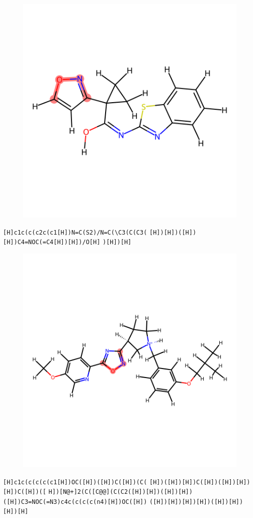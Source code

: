 \documentclass{article}
\begin{document}
\begin{figure}[ht]
\centering
    \includegraphics{mol174.png}
\end{figure}
\verb|[H]c1c(c(c2c(c1[H])N=C(S2)/N=C(\C3(C(C3(| \verb|[H])[H])([H])[H])C4=NOC(=C4[H])[H])/O[H]| \verb|)[H])[H]|

\begin{figure}[ht]
\centering
    \includegraphics{mol175.png}
\end{figure}
\verb|[H]c1c(c(c(c(c1[H])OC([H])([H])C([H])(C(| \verb|[H])([H])[H])C([H])([H])[H])[H])C([H])([| \verb|H])[N@+]2(C([C@@](C(C2([H])[H])([H])[H])| \verb|([H])C3=NOC(=N3)c4c(c(c(c(n4)[H])OC([H])| \verb|([H])[H])[H])[H])([H])[H])[H])[H]|
\end{document}

